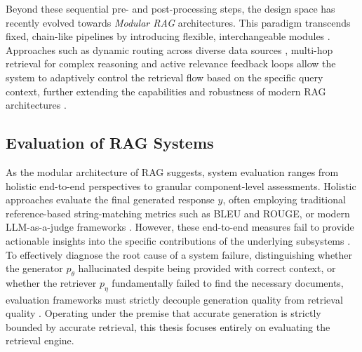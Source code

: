 Beyond these sequential pre- and post-processing steps, the design space has recently evolved towards \emph{Modular \ac{RAG}} architectures. This paradigm transcends fixed, chain-like pipelines by introducing flexible, interchangeable modules \cite{gao_2024_rag}. Approaches such as dynamic routing across diverse data sources \cite{Li2023_Routing}, multi-hop retrieval for complex reasoning \cite{Trivedi2022_IRCoT} and active relevance feedback loops allow the system to adaptively control the retrieval flow based on the specific query context, further extending the capabilities and robustness of modern \ac{RAG} architectures \cite{Jiang2023_FLARE,Asai2023_SelfRAG,gao_2024_rag}.



\subsection{Evaluation of \acs{RAG} Systems}
\label{sec:rag_evaluation}


As the modular architecture of \ac{RAG} suggests, system evaluation ranges from holistic end-to-end perspectives to granular component-level assessments. Holistic approaches evaluate the final generated response $y$, often employing traditional reference-based string-matching metrics such as BLEU and ROUGE, or modern \ac{LLM}-as-a-judge frameworks \cite{gan2025retrieval,gao_2024_rag,es2023ragas}. However, these end-to-end measures fail to provide actionable insights into the specific contributions of the underlying subsystems \cite{gao_2024_rag}. To effectively diagnose the root cause of a system failure, distinguishing whether the generator $p_\theta$ hallucinated despite being provided with correct context, or whether the retriever $p_\eta$ fundamentally failed to find the necessary documents, evaluation frameworks must strictly decouple generation quality from retrieval quality \cite{barnett2024seven,es2023ragas}. Operating under the premise that accurate generation is strictly bounded by accurate retrieval, this thesis focuses entirely on evaluating the retrieval engine.

